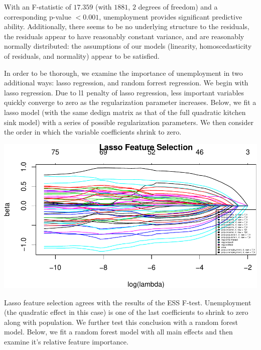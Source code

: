 \documentclass[]{article}
\begin{document}
With an F-statistic of \(17.359\) (with \(1881\), \(2\) degrees of
freedom) and a corresponding p-value \(<0.001\), unemployment provides
significant predictive ability. Additionally, there seems to be no
underlying structure to the residuals, the residuals appear to have
reasonably constant variance, and are reasonably normally distributed:
the assumptions of our models (linearity, homoscedasticity of residuals,
and normality) appear to be satisfied.

In order to be thorough, we examine the importance of unemployment in
two additional ways: lasso regression, and random forrest regression. We
begin with lasso regression. Due to l1 penalty of lasso regression, less
important variables quickly converge to zero as the regularization
parameter increases. Below, we fit a lasso model (with the same dedign
matrix as that of the full quadratic kitchen sink model) with a series
of possible regularization parameters. We then consider the order in
which the variable coefficients shrink to zero.

\begin{center}\includegraphics{stat139_project_final_files/figure-latex/lasso-1} \end{center}

Lasso feature selection agrees with the results of the ESS F-test.
Unemployment (the quadratic effect in this case) is one of the last
coefficients to shrink to zero along with population. We further test
this conclusion with a random forest model. Below, we fit a random
forest model with all main effects and then examine it's relative
feature importance.
\end{document}
